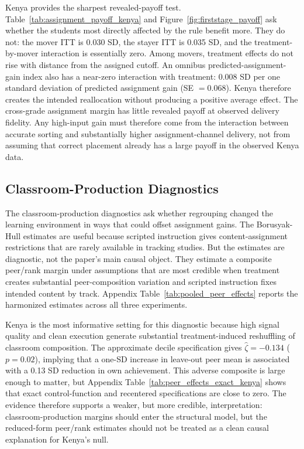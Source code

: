 \documentclass[11pt]{article}
\begin{document}
Kenya provides the sharpest revealed-payoff test. Table~\ref{tab:assignment_payoff_kenya} and Figure~\ref{fig:firststage_payoff} ask whether the students most directly affected by the rule benefit more. They do not: the mover ITT is 0.030 SD, the stayer ITT is 0.035 SD, and the treatment-by-mover interaction is essentially zero. Among movers, treatment effects do not rise with distance from the assigned cutoff. An omnibus predicted-assignment-gain index also has a near-zero interaction with treatment: 0.008 SD per one standard deviation of predicted assignment gain (SE $=0.068$). Kenya therefore creates the intended reallocation without producing a positive average effect. The cross-grade assignment margin has little revealed payoff at observed delivery fidelity. Any high-input gain must therefore come from the interaction between accurate sorting and substantially higher assignment-channel delivery, not from assuming that correct placement already has a large payoff in the observed Kenya data.

\subsection{Classroom-Production Diagnostics}

The classroom-production diagnostics ask whether regrouping changed the learning environment in ways that could offset assignment gains. The Borusyak-Hull estimates are useful because scripted instruction gives content-assignment restrictions that are rarely available in tracking studies. But the estimates are diagnostic, not the paper's main causal object. They estimate a composite peer/rank margin under assumptions that are most credible when treatment creates substantial peer-composition variation and scripted instruction fixes intended content by track. Appendix Table~\ref{tab:pooled_peer_effects} reports the harmonized estimates across all three experiments.

Kenya is the most informative setting for this diagnostic because high signal quality and clean execution generate substantial treatment-induced reshuffling of classroom composition. The approximate decile specification gives $\hat{\zeta}=-0.134$ ($p=0.02$), implying that a one-SD increase in leave-out peer mean is associated with a 0.13 SD reduction in own achievement. This adverse composite is large enough to matter, but Appendix Table~\ref{tab:peer_effects_exact_kenya} shows that exact control-function and recentered specifications are close to zero. The evidence therefore supports a weaker, but more credible, interpretation: classroom-production margins should enter the structural model, but the reduced-form peer/rank estimates should not be treated as a clean causal explanation for Kenya's null.
\end{document}
